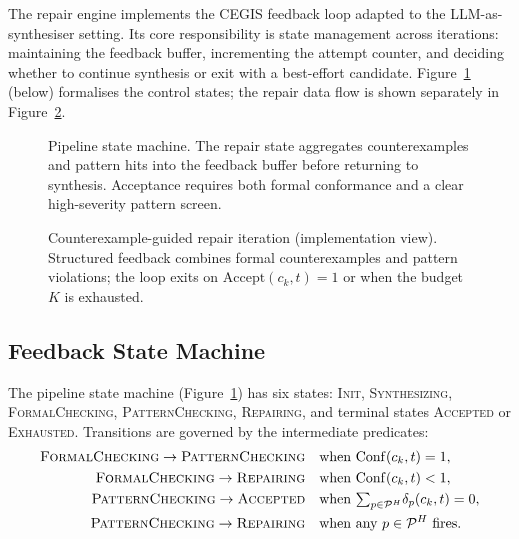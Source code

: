 The repair engine implements the CEGIS feedback loop
\citep{solarlezama2008sketching} adapted to the LLM-as-synthesiser setting.
Its core responsibility is state management across iterations: maintaining the
feedback buffer, incrementing the attempt counter, and deciding whether to
continue synthesis or exit with a best-effort candidate.
Figure~\ref{fig:pipeline-state} (below) formalises the control states; the
repair data flow is shown separately in Figure~\ref{fig:repair-feedback-impl}.

\begin{figure}[t]
  \centering
  \caption{Pipeline state machine.  The repair state aggregates
           counterexamples and pattern hits into the feedback buffer before
           returning to synthesis.  Acceptance requires both formal
           conformance and a clear high-severity pattern screen.}
  \label{fig:pipeline-state}
\end{figure}

\begin{figure}[t]
  \centering
  \caption{Counterexample-guided repair iteration (implementation view).
           Structured feedback combines formal counterexamples and pattern
           violations; the loop exits on $\mathrm{Accept}(c_k,t)=1$ or when
           the budget~$K$ is exhausted.}
  \label{fig:repair-feedback-impl}
\end{figure}

\subsection{Feedback State Machine}

The pipeline state machine (Figure~\ref{fig:pipeline-state}) has six states:
\textsc{Init}, \textsc{Synthesizing}, \textsc{FormalChecking},
\textsc{PatternChecking}, \textsc{Repairing}, and terminal states
\textsc{Accepted} or \textsc{Exhausted}.  Transitions are governed by the
intermediate predicates:
\begin{align*}
  \textsc{FormalChecking} \to \textsc{PatternChecking}
    &\quad\text{when } \mathrm{Conf}(c_k, t) = 1, \\
  \textsc{FormalChecking} \to \textsc{Repairing}
    &\quad\text{when } \mathrm{Conf}(c_k, t) < 1, \\
  \textsc{PatternChecking} \to \textsc{Accepted}
    &\quad\text{when } {\textstyle\sum_{p \in \mathcal{P}^H}} \delta_p(c_k,t) = 0, \\
  \textsc{PatternChecking} \to \textsc{Repairing}
    &\quad\text{when any } p \in \mathcal{P}^H \text{ fires}.
\end{align*}

